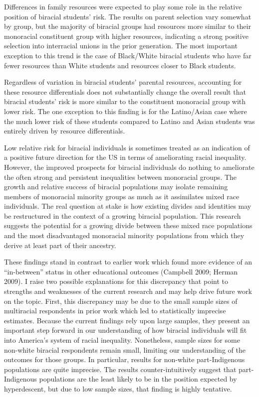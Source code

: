 \documentclass[
  letterpaper,
  DIV=11,
  numbers=noendperiod]{scrartcl}
\begin{document}
Differences in family resources were expected to play some role in the
relative position of biracial students' risk. The results on parent
selection vary somewhat by group, but the majority of biracial groups
had resources more similar to their monoracial constituent group with
higher resources, indicating a strong positive selection into
interracial unions in the prior generation. The most important exception
to this trend is the case of Black/White biracial students who have far
fewer resources than White students and resources closer to Black
students.

Regardless of variation in biracial students' parental resources,
accounting for these resource differentials does not substantially
change the overall result that biracial students' risk is more similar
to the constituent monoracial group with lower risk. The one exception
to this finding is for the Latino/Asian case where the much lower risk
of these students compared to Latino and Asian students was entirely
driven by resource differentials.

Low relative risk for biracial individuals is sometimes treated as an
indication of a positive future direction for the US in terms of
ameliorating racial inequality. However, the improved prospects for
biracial individuals do nothing to ameliorate the often strong and
persistent inequalities between monoracial groups. The growth and
relative success of biracial populations may isolate remaining members
of monoracial minority groups as much as it assimilates mixed race
individuals. The real question at stake is how existing divides and
identities may be restructured in the context of a growing biracial
population. This research suggests the potential for a growing divide
between these mixed race populations and the most disadvantaged
monoracial minority populations from which they derive at least part of
their ancestry.

These findings stand in contrast to earlier work which found more
evidence of an ``in-between'' status in other educational outcomes
(Campbell 2009; Herman 2009). I raise two possible explanations for this
discrepancy that point to strengths and weaknesses of the current
research and may help drive future work on the topic. First, this
discrepancy may be due to the small sample sizes of multiracial
respondents in prior work which led to statistically imprecise
estimates. Because the current findings rely upon large samples, they
present an important step forward in our understanding of how biracial
individuals will fit into America's system of racial inequality.
Nonetheless, sample sizes for some non-white biracial respondents remain
small, limiting our understanding of the outcomes for those groups. In
particular, results for non-white part-Indigenous populations are quite
imprecise. The results counter-intuitively suggest that part-Indigenous
populations are the least likely to be in the position expected by
hyperdescent, but due to low sample sizes, that finding is highly
tentative.
\end{document}
